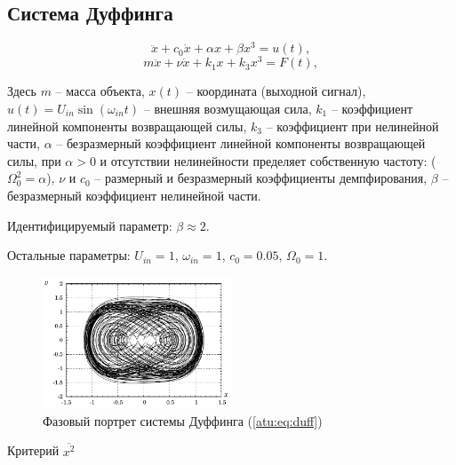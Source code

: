 
\FloatBarrier
\subsection{Система Дуффинга} %


\begin{equation}
 \ddot{x} + c_0 \dot{x} + \alpha x + \beta x^3 = u(t) ,
\label{atu:eq:duff}
\end{equation}
%
\begin{equation}
 m \ddot{x} + \nu \dot{x} + k_1 x + k_3 x^3 = F(t) ,
\label{atu:eq:duff_phys}
\end{equation}

Здесь $m$ -- масса объекта,
$x(t)$ -- координата (выходной сигнал),
$u(t) = U_{in} \sin( \omega_{in} t ) $ -- внешняя возмущающая сила,
$ k_1 $ -- коэффициент линейной компоненты возвращающей силы,
$ k_3 $ -- коэффициент при нелинейной части,
$ \alpha $ -- безразмерный коэффициент линейной компоненты возвращающей силы,
 при $ \alpha >0 $ и отсутствии нелинейности пределяет собственную частоту: ($\Omega_0^2 = \alpha $),
$ \nu $ и $ c_0$ -- размерный и безразмерный коэффициенты демпфирования,
$ \beta $ -- безразмерный коэффициент нелинейной части.

Идентифицируемый параметр:
$ \beta \approx 2 $.

Остальные параметры:
\(U_{in}=1\), \(\omega_{in}=1\),
\(c_0 = 0.05\), \( \Omega_0 = 1 \).

\begin{figure}[htb!]
\centerline{\includegraphics[width=0.5\textwidth]{p/cha/duff_phase.pdf} }
\caption{Фазовый портрет системы Дуффинга (\ref{atu:eq:duff})}
\label{atu:f:duff_phase}
\end{figure}

Критерий
$\overline{x^2}$

